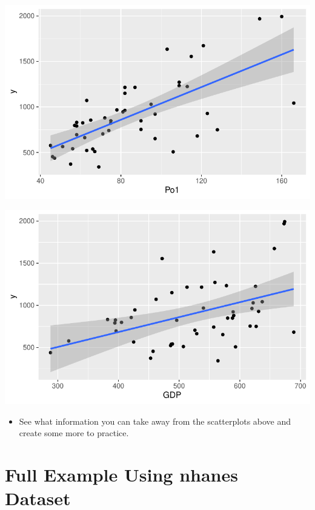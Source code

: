\documentclass[
  letterpaper,
  DIV=11,
  numbers=noendperiod]{scrreprt}
\providecommand{\tightlist}{%
  \setlength{\itemsep}{0pt}\setlength{\parskip}{0pt}}\usepackage{longtable,booktabs,array}
\begin{document}
\includegraphics{dataviz_files/figure-pdf/unnamed-chunk-57-3.pdf}

\includegraphics{dataviz_files/figure-pdf/unnamed-chunk-57-4.pdf}

\begin{itemize}
\tightlist
\item
  See what information you can take away from the scatterplots above and
  create some more to practice.
\end{itemize}


\chapter{Full Example Using nhanes
Dataset}\label{full-example-using-nhanes-dataset}
\end{document}
